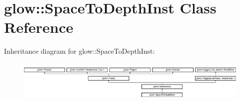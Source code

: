 \hypertarget{classglow_1_1_space_to_depth_inst}{}\section{glow\+:\+:Space\+To\+Depth\+Inst Class Reference}
\label{classglow_1_1_space_to_depth_inst}
Inheritance diagram for glow\+:\+:Space\+To\+Depth\+Inst\+:\begin{figure}[H]
\begin{center}
\leavevmode
\includegraphics[height=1.991111cm]{classglow_1_1_space_to_depth_inst}
\end{center}
\end{figure}
